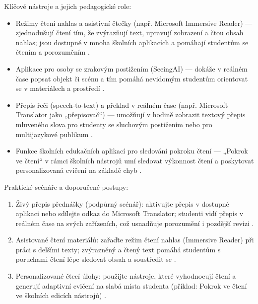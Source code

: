 \documentclass{report}%
\begin{document}
\bigskip

Klíčové nástroje a jejich pedagogické role:
\begin{itemize}
  \item Režimy čtení nahlas a asistivní čtečky (např. Microsoft Immersive Reader) — zjednodušují čtení tím, že zvýrazňují text, upravují zobrazení a čtou obsah nahlas; jsou dostupné v mnoha školních aplikacích a pomáhají studentům se čtením a porozuměním \cite{kb_ai_101_tipu_pdf_04e4a115_page_11_1}.
  \item Aplikace pro osoby se zrakovým postižením (SeeingAI) — dokáže v reálném čase popsat objekt či scénu a tím pomáhá nevidomým studentům orientovat se v materiálech a prostředí \cite{kb_ai_101_tipu_pdf_04e4a115_page_11_1}.
  \item Přepis řeči (speech‑to‑text) a překlad v reálném čase (např. Microsoft Translator jako „přepisovač“) — umožňují v hodině zobrazit textový přepis mluveného slova pro studenty se sluchovým postižením nebo pro multijazykové publikum \cite{kb_ai_101_tipu_pdf_04e4a115_page_11_1}.
  \item Funkce školních edukačních aplikací pro sledování pokroku čtení — „Pokrok ve čtení“ v rámci školních nástrojů umí sledovat výkonnost čtení a poskytovat personalizovaná cvičení na základě chyb \cite{kb_ai_101_tipu_pdf_04e4a115_page_7_1}.
\end{itemize}

Praktické scénáře a doporučené postupy:
\begin{enumerate}
  \item Živý přepis přednášky (podpůrný scénář): aktivujte přepis v dostupné aplikaci nebo sdílejte odkaz do Microsoft Translator; studenti vidí přepis v reálném čase na svých zařízeních, což usnadňuje porozumění i pozdější revizi \cite{kb_ai_101_tipu_pdf_04e4a115_page_11_1}.
  \item Asistované čtení materiálů: zařaďte režim čtení nahlas (Immersive Reader) při práci s delšími texty; zvýrazněný a čtený text pomáhá studentům s poruchami čtení lépe sledovat obsah a soustředit se \cite{kb_ai_101_tipu_pdf_04e4a115_page_11_1}.
  \item Personalizované čtecí úlohy: použijte nástroje, které vyhodnocují čtení a generují adaptivní cvičení na slabá místa studenta (příklad: Pokrok ve čtení ve školních edicích nástrojů) \cite{kb_ai_101_tipu_pdf_04e4a115_page_7_1}.
\end{enumerate}
\end{document}
